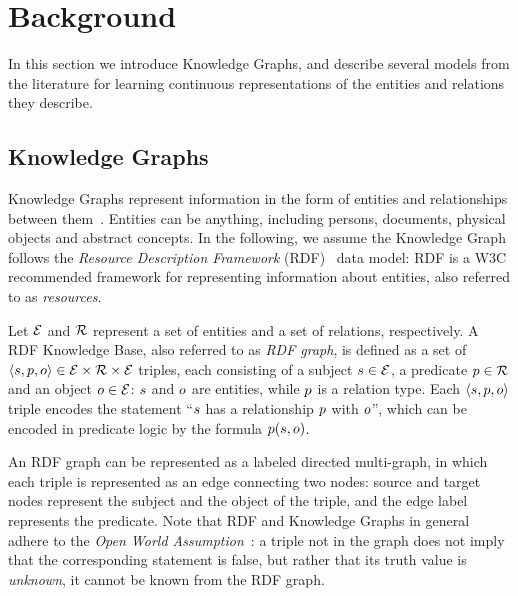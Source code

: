 
\section{Background} \label{sec:background}

%
In this section we introduce Knowledge Graphs, and describe several models from the literature for learning continuous representations of the entities and relations they describe.
%

\subsection{Knowledge Graphs}

%
Knowledge Graphs represent information in the form of entities and relationships between them~\cite{DBLP:journals/pieee/Nickel0TG16}.
%
Entities can be anything, including persons, documents, physical objects and abstract concepts.
%
In the following, we assume the Knowledge Graph follows the \emph{Resource Description Framework} (RDF)~\cite{Wood:14:RCA} data model: RDF is a W3C recommended framework for representing information about entities, also referred to as \emph{resources}.
%

%
Let $\mathcal{E}$ and $\mathcal{R}$ represent a set of entities and a set of relations, respectively.
%
A RDF Knowledge Base, also referred to as \emph{RDF graph}, is defined as a set of $\langle s, p, o \rangle \in \mathcal{E} \times \mathcal{R} \times \mathcal{E}$ triples, each consisting of a subject $s \in \mathcal{E}$, a predicate $p \in \mathcal{R}$ and an object $o \in \mathcal{E}$: $s$ and $o$ are entities, while $p$ is a relation type.
%
Each $\langle s, p, o \rangle$ triple encodes the statement ``$s$ has a relationship $p$ with $o$'', which can be encoded in predicate logic by the formula $p(s, o)$.
%

%
An RDF graph can be represented as a labeled directed multi-graph, in which each triple is represented as an edge connecting two nodes: source and target nodes represent the subject and the object of the triple, and the edge label represents the predicate.
%
Note that RDF and Knowledge Graphs in general adhere to the \emph{Open World Assumption}~\cite{Hayes:14:RS}: a triple not in the graph does not imply that the corresponding statement is false, but rather that its truth value is \emph{unknown}, \ie it cannot be known from the RDF graph.
%

